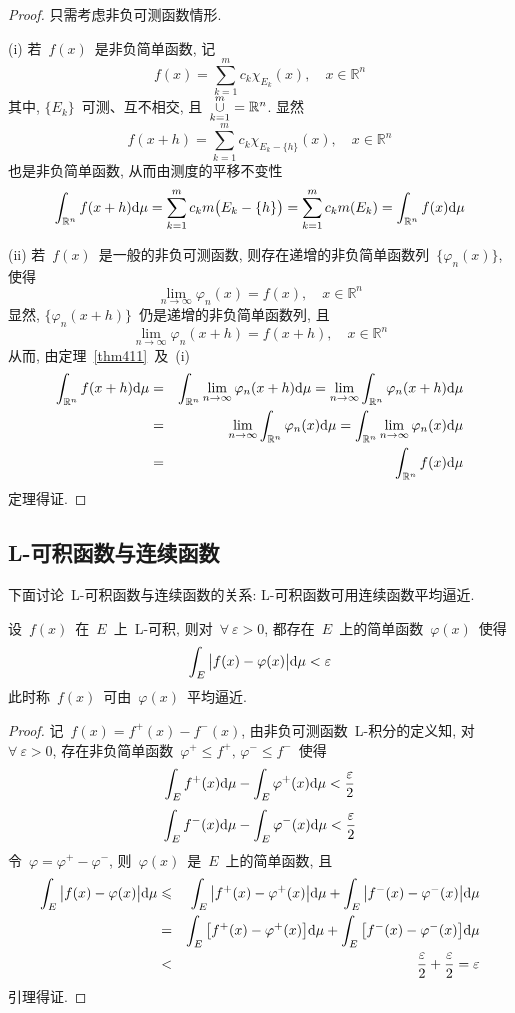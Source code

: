 \begin{proof}
只需考虑非负可测函数情形.

(i) 若~$f(x)$~是非负简单函数, 记
\[
f(x) = \sum_{k=1}^m c_k \chi_{E_k}(x), \quad x \in \mathbb{R}^n
\]
其中, $\{E_k\}$~可测、互不相交, 且~$\mathop{\mathop{\cup}}\limits_{k=1}^m = \mathbb{R}^n$. 显然
\[
f(x+h) = \sum_{k=1}^m c_k \chi_{E_k - \{h\}}(x), \quad x \in \mathbb{R}^n
\]
也是非负简单函数, 从而由测度的平移不变性
\[
\int_{\mathbb{R}^n} f(x + h) \mathrm{d} \mu = \sum_{k=1}^m c_k m\big( E_k - \{h\} \big)
= \sum_{k=1}^m c_k m(E_k) = \int_{\mathbb{R}^n} f(x) \mathrm{d} \mu
\]

(ii) 若~$f(x)$~是一般的非负可测函数, 则存在递增的非负简单函数列~$\{\varphi_n(x)\}$, 使得
\[
\lim_{n \to \infty} \varphi_n(x) = f(x), \quad x \in \mathbb{R}^n
\]
显然, $\{\varphi_n(x + h)\}$~仍是递增的非负简单函数列, 且
\[
\lim_{n \to \infty} \varphi_n(x+h) = f(x+h), \quad x \in \mathbb{R}^n
\]
从而, 由定理~\ref{thm411}~及~(i)
\begin{eqnarray*}
\int_{\mathbb{R}^n} f(x + h) \mathrm{d} \mu &=& \int_{\mathbb{R}^n} \lim_{n \to \infty} \varphi_n(x+h) \mathrm{d} \mu = \lim_{n \to \infty} \int_{\mathbb{R}^n} \varphi_n(x+h) \mathrm{d} \mu \\
&=& \lim_{n \to \infty} \int_{\mathbb{R}^n} \varphi_n(x) \mathrm{d} \mu =  \int_{\mathbb{R}^n} \lim_{n \to \infty} \varphi_n(x) \mathrm{d} \mu \\
&=& \int_{\mathbb{R}^n} f(x) \mathrm{d} \mu
\end{eqnarray*}
定理得证.
\end{proof}

\subsection{L-可积函数与连续函数}

下面讨论~L-可积函数与连续函数的关系: L-可积函数可用连续函数平均逼近.

\begin{lemma} \label{lem432}
设~$f(x)$~在~$E$~上~L-可积, 则对~$\forall~ \varepsilon > 0$, 都存在~$E$~上的简单函数~$\varphi(x)$~使得
\[
\int_E \big|f(x) - \varphi(x) \big| \mathrm{d} \mu < \varepsilon
\]
此时称~$f(x)$~可由~$\varphi(x)$~平均逼近.
\end{lemma}

\begin{proof}
记~$f(x) = f^+(x) - f^-(x)$, 由非负可测函数~L-积分的定义知, 对~$\forall~ \varepsilon > 0$,  存在非负简单函数~$\varphi^+ \leqslant f^+, \, \varphi^- \leqslant f^-$~使得
\[
\int_E f^+(x) \mathrm{d} \mu - \int_E \varphi^+(x) \mathrm{d} \mu < \frac{\varepsilon}{2}
\]
\[
\int_E f^-(x) \mathrm{d} \mu - \int_E \varphi^-(x) \mathrm{d} \mu < \frac{\varepsilon}{2}
\]
令~$\varphi = \varphi^+ - \varphi^-$, 则~$\varphi(x)$~是~$E$~上的简单函数, 且
\begin{eqnarray*}
\int_E \big|f(x) - \varphi(x) \big| \mathrm{d} \mu &\leqslant& \int_E \big|f^+(x) - \varphi^+(x) \big| \mathrm{d} \mu + \int_E \big|f^-(x) - \varphi^-(x) \big| \mathrm{d} \mu \\
&=& \int_E \big[f^+(x) - \varphi^+(x) \big] \mathrm{d} \mu + \int_E \big[f^-(x) - \varphi^-(x) \big] \mathrm{d} \mu \\
&<& \frac{\varepsilon}{2} + \frac{\varepsilon}{2} = \varepsilon
\end{eqnarray*}
引理得证.
\end{proof}

